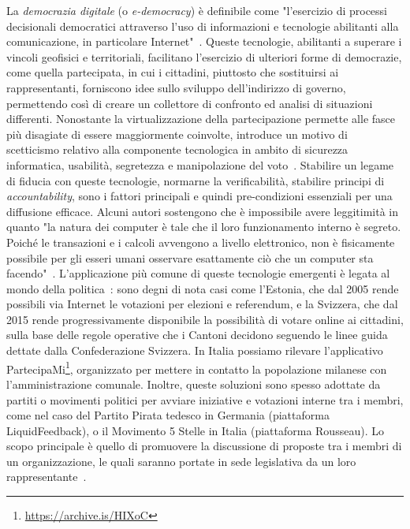 \documentclass[12pt,a4paper,openright,twoside]{book}
\begin{document}
La \textit{democrazia digitale} (o \textit{e-democracy}) è definibile come "l'esercizio di processi decisionali democratici attraverso 
l'uso di informazioni e tecnologie abilitanti alla comunicazione, in particolare Internet"~\cite{rotzocki}.
Queste tecnologie, abilitanti a superare i vincoli geofisici e territoriali,
facilitano l'esercizio di ulteriori forme di democrazie,
come quella partecipata, in cui i cittadini, piuttosto che
sostituirsi ai rappresentanti, forniscono idee sullo sviluppo dell'indirizzo di governo,
permettendo così di creare un collettore di confronto ed analisi di situazioni differenti.
Nonostante la virtualizzazione della partecipazione permette alle fasce più disagiate di essere
maggiormente coinvolte, introduce un motivo di scetticismo relativo alla componente tecnologica
in ambito di sicurezza informatica, usabilità, segretezza e manipolazione del voto~\cite{aichholzer2020experience}.
Stabilire un legame di fiducia con queste tecnologie, normarne la verificabilità, stabilire principi di 
\textit{accountability}, sono i fattori principali e quindi pre-condizioni essenziali
per una diffusione efficace. 
Alcuni autori sostengono che è impossibile avere leggitimità in quanto "la natura dei computer è tale che il loro funzionamento interno è segreto.
Poiché le transazioni e i calcoli avvengono a livello elettronico, 
non è fisicamente possibile per gli esseri umani osservare esattamente ciò che un computer sta facendo"~\cite{mcgaley}.
L'applicazione più comune di queste tecnologie emergenti è legata al mondo della politica~\cite{aichholzer2020experience}:
sono degni di nota casi come l'Estonia, che dal 2005 rende possibili via Internet le votazioni
per elezioni e referendum, e la Svizzera, che dal 2015 rende progressivamente disponibile la possibilità di votare online
ai cittadini, sulla base delle regole operative che i Cantoni decidono seguendo le linee guida dettate 
dalla Confederazione Svizzera.
In Italia possiamo rilevare l'applicativo PartecipaMi\footnote{\url{https://archive.is/HIXoC}},
organizzato per mettere in contatto la popolazione milanese con l'amministrazione comunale.
Inoltre, queste soluzioni sono spesso adottate da partiti o movimenti politici per avviare iniziative
e votazioni interne tra i membri, come nel caso del Partito Pirata tedesco in Germania (piattaforma LiquidFeedback),
o il Movimento 5 Stelle in Italia (piattaforma Rousseau). Lo scopo principale è quello di promuovere la discussione
di proposte tra i membri di un organizzazione, le quali saranno portate in sede legislativa da un loro rappresentante~\cite{korthagen2020non}.
\end{document}

